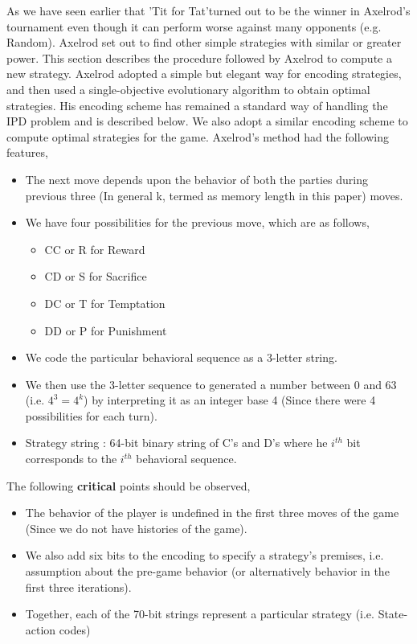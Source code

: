 \documentclass[a4paper]{article}
\begin{document}
As we have seen earlier that 'Tit for Tat'turned out to be the winner in Axelrod's tournament even though it can perform worse against many opponents (e.g. Random). Axelrod set out to find other simple strategies with similar or greater power. This section describes the procedure followed by Axelrod to compute a new strategy.
Axelrod adopted a simple but elegant way for encoding strategies, and then used a single-objective evolutionary algorithm to obtain optimal strategies. His encoding scheme has remained a standard way of handling the IPD problem and is described below. We also adopt a similar encoding scheme to compute optimal strategies for the game. Axelrod's method had the following features,
	\begin{itemize}
	\item The next move depends upon the behavior of both the parties during previous three (In general k, termed as memory length in this paper) moves.
	\item We have four possibilities for the previous move, which are as follows,
	\begin{itemize}
		\item CC or R for Reward
		\item CD or S for Sacrifice
		\item DC or T for Temptation
		\item DD or P for Punishment
	\end{itemize}		
	\item We code the particular behavioral sequence as a 3-letter string.	
	\item We then use the 3-letter sequence to generated a number between 0 and 63 (i.e. $4^{3} = 4^{k}$) by interpreting it as an integer base 4 (Since there were 4 possibilities for each turn).
	\item Strategy string : 64-bit binary string of C's and D's where he $i^{th}$ bit corresponds to the $i^{th}$ behavioral sequence.
	\end{itemize}

	The following \textbf{critical} points should be observed,
	\begin{itemize}
	\item The behavior of the player is undefined in the first three moves of the game (Since we do not have histories of the game).
	\item We also add six bits to the encoding to specify a strategy's premises, i.e. assumption about the pre-game behavior (or alternatively behavior in the first three iterations).
	\item Together, each of the 70-bit strings represent a particular strategy (i.e. State-action codes)	
	\end{itemize}		
	
\end{document}
